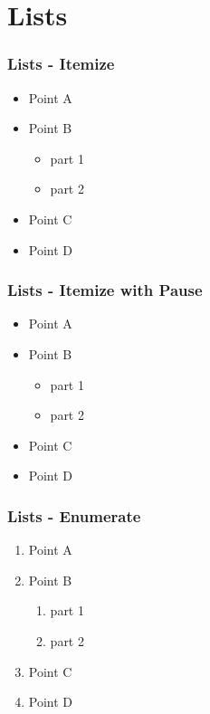 \section{Lists}
\label{itemize}
\begin{frame}\frametitle{Lists - Itemize}
  \begin{itemize}
    \item Point A
    \item Point B
    \begin{itemize}
      \item part 1
      \item part 2
    \end{itemize}
    \item Point C
    \item Point D
  \end{itemize}
\end{frame}

\label{pause}
\begin{frame}\frametitle{Lists - Itemize with Pause}
  \begin{itemize}
    \pause \item Point A
    \pause \item Point B
    \begin{itemize}
      \pause \item part 1
      \pause \item part 2
    \end{itemize}
    \pause \item Point C
    \pause \item Point D
  \end{itemize}
\end{frame}

\label{enumerate}
\begin{frame}\frametitle{Lists - Enumerate}
  \begin{enumerate}
    \item Point A
    \item Point B
    \begin{enumerate}
      \item part 1
      \item part 2
    \end{enumerate}
    \item Point C
    \item Point D
  \end{enumerate}
\end{frame}


